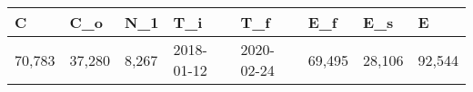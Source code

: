 \begin{tabular}{llllllll}
\toprule
      C &     C\_o &    N\_1 &         T\_i &         T\_f &     E\_f &     E\_s &       E \\
\midrule
 70,783 &  37,280 &  8,267 &  2018-01-12 &  2020-02-24 &  69,495 &  28,106 &  92,544 \\
\bottomrule
\end{tabular}
